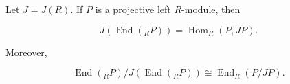 Let $J = J(R)$. If $P$ is a projective left $R$-module, then

$$J(\operatorname{End}({}_R P)) = \operatorname{Hom}_R(P, JP).$$

Moreover,

$$\operatorname{End}({}_R P) / J(\operatorname{End}({}_R P)) \cong \operatorname{End}_R(P/JP).$$

